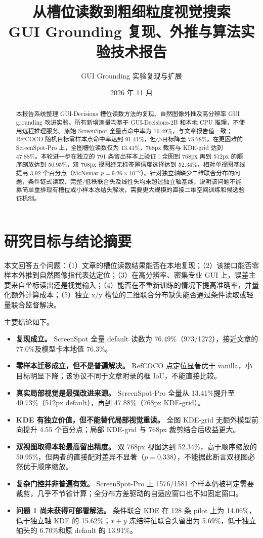 \documentclass[UTF8,a4paper,11pt,fontset=none]{ctexart}
\title{\bfseries 从槽位读数到粗细粒度视觉搜索\\GUI Grounding 复现、外推与算法实验技术报告}
\author{GUI Grounding 实验复现与扩展}
\date{2026 年 11 月}
\begin{document}
\maketitle

\begin{abstract}
本报告系统整理 GUI-Decisions 槽位读数方法的复现、自然图像外推及高分辨率 GUI grounding 改进实验。所有新增测量均基于 GUI-Decisions-2B 和本地 CPU 推理，不使用远程推理服务。原始 ScreenSpot 全量点命中率为 76.49\%，与文章报告值一致；RefCOCO 随机目标零样本点命中率达到 91.41\%，但小目标降至 75.78\%。在更困难的 ScreenSpot-Pro 上，全图槽位读数仅为 13.41\%，768px 裁剪与 KDE-grid 达到 47.88\%。本轮进一步在独立的 791 条留出样本上验证：全图到 768px 再到 512px 的顺序缩放达到 50.95\%，双 768px 视图经无标签置信度选择达到 52.34\%，相对单视图基线提高 3.92 个百分点（McNemar $p=9.26\times10^{-6}$）。针对独立轴缺少二维联合分布的问题，条件链式读取、完整/低秩联合头及线性头均未超过独立轴基线，说明该问题不能靠简单重排现有槽位或小样本冻结头解决，需要更大规模的直接二维空间训练和候选验证机制。
\end{abstract}

\section{研究目标与结论摘要}
本文回答五个问题：（1）文章的槽位读数结果能否在本地复现；（2）该接口能否零样本外推到自然图像指代表达定位；（3）在高分辨率、密集专业 GUI 上，误差主要来自坐标读出还是视觉输入；（4）能否在不重新训练的情况下提高准确率，并量化额外计算成本；（5）独立 x/y 槽位的二维联合分布缺失能否通过条件读取或轻量联合监督解决。

主要结论如下。
\begin{itemize}
  \item \textbf{复现成立。} ScreenSpot 全量 default 读数为 76.49\%（973/1272），接近文章的 77.0\%及模型卡本地值 76.3\%。
  \item \textbf{零样本迁移成立，但不是普遍解决。} RefCOCO 点定位显著优于 vanilla，小目标明显下降；该协议不同于文章附录的框 IoU，不能直接比较。
  \item \textbf{真实局部视觉是最强改进来源。} ScreenSpot-Pro 全量从 13.41\%提升至 40.73\%（512px default），再到 47.88\%（768px KDE-grid）。
  \item \textbf{KDE 有独立价值，但不能替代局部视觉重读。} 全图 KDE-grid 无额外模型前向提升 4.55 个百分点；局部 KDE-grid 与 768px 裁剪结合后收益更大。
  \item \textbf{双视图取得本轮最高留出精度。} 双 768px 视图达到 52.34\%，高于顺序缩放的 50.95\%，但两者的直接配对差异不显著（$p=0.338$），不能据此断言双视图必然优于顺序缩放。
  \item \textbf{复杂门控并非普遍有效。} ScreenSpot-Pro 上 1576/1581 个样本仍被判定需要裁剪，几乎不节省计算；全分布方差驱动的自适应窗口也不如固定窗口。
  \item \textbf{问题 1 尚未获得可部署解法。} 条件联合 KDE 在 128 条 pilot 上为 14.06\%，低于独立轴 KDE 的 15.62\%；$x+y$ 冻结特征联合头留出为 5.69\%，低于独立轴头的 6.70\%和原 default 的 13.91\%。
\end{itemize}
\end{document}
